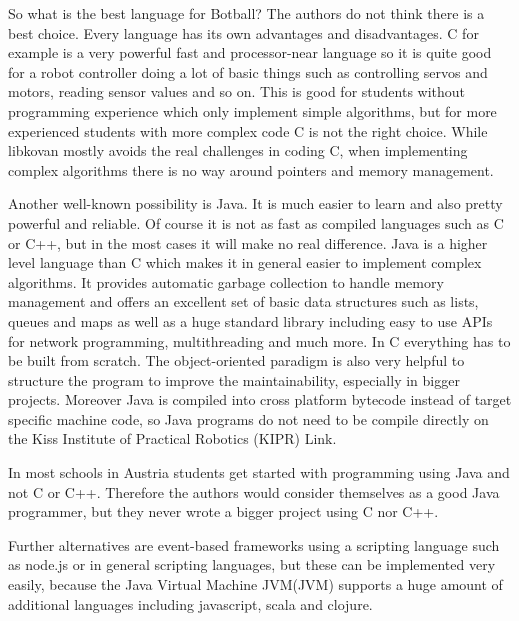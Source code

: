 \documentclass{juniorjournal}
\begin{document}
So what is the best language for Botball?
The authors do not think there is a best choice.
Every language has its own advantages and disadvantages.
C for example is a very powerful fast and processor-near language so it is quite good for a robot controller doing a lot of basic things such as controlling servos and motors, reading sensor values and so on.
This is good for students without programming experience which only implement simple algorithms, but for more experienced students with more complex code C is not the right choice.
While libkovan mostly avoids the real challenges in coding C, when implementing complex algorithms there is no way around pointers and memory management.

Another well-known possibility is Java\cite{Java}.
It is much easier to learn and also pretty powerful and reliable.
Of course it is not as fast as compiled languages such as C or C++, but in the most cases it will make no real difference.
Java is a higher level language than C which makes it in general easier to implement complex algorithms.
It provides automatic garbage collection to handle memory management
and offers an excellent set of basic data structures such as lists, queues and maps as well as a huge standard library including easy to use APIs for network programming, multithreading and much more.
In C everything has to be built from scratch.
The object-oriented paradigm is also very helpful to structure the program
to improve the maintainability, especially in bigger projects.
Moreover Java is compiled into cross platform bytecode instead of target specific machine code, so Java programs do not need to be compile directly on the Kiss Institute of Practical Robotics\cite{KIPR} (KIPR) Link\cite{link}.

In most schools in Austria students get started with programming using Java and not C or C++.
Therefore the authors would consider themselves as a good Java programmer,
but they never wrote a bigger project using C nor C++.

Further alternatives are event-based frameworks using a scripting language
such as node.js\cite{node} or in general scripting languages, but these can be implemented very easily,
because the Java Virtual Machine JVM\cite{JVM}(JVM) supports a huge amount of additional languages
including javascript, scala and clojure.
\end{document}

